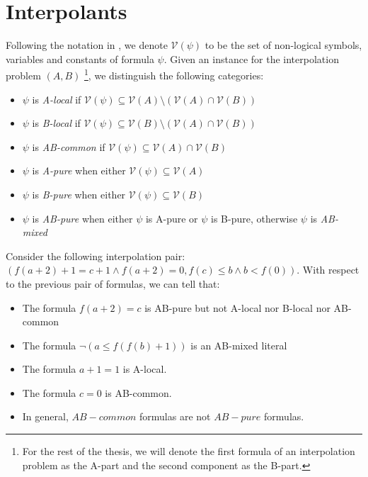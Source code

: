 \section{Interpolants}

Following the notation in \cite{10.1007/11532231_26}, we denote 
$\mathcal{V}(\psi)$ to be the set of non-logical symbols, variables
and constants of formula $\psi$. Given an instance for the interpolation
problem $(A, B)$ \footnote{For the rest of the thesis, we will denote the 
  first formula of an interpolation problem as the A-part 
and the second component as the B-part.}, 
we distinguish the following categories:

\begin{itemize}
  \item $\psi$ is \emph{A-local} if $\mathcal{V}(\psi) \subseteq 
    \mathcal{V}(A) \setminus (\mathcal{V}(A) \cap \mathcal{V}(B))$
  \item $\psi$ is \emph{B-local} if $\mathcal{V}(\psi) \subseteq
    \mathcal{V}(B) \setminus (\mathcal{V}(A) \cap \mathcal{V}(B))$
  \item $\psi$ is \emph{AB-common} if $\mathcal{V}(\psi) \subseteq
    \mathcal{V}(A) \cap \mathcal{V}(B)$
\item $\psi$ is \emph{A-pure} when either 
    $\mathcal{V}(\psi) \subseteq \mathcal{V}(A)$ 
\item $\psi$ is \emph{B-pure} when either 
    $\mathcal{V}(\psi) \subseteq \mathcal{V}(B)$ 
  \item $\psi$ is \emph{AB-pure} when either 
    $\psi$ is A-pure or $\psi$ is B-pure, otherwise
    $\psi$ is \emph{AB-mixed}
\end{itemize}

\begin{example} \label{first_example}

  Consider the following interpolation pair: $(f(a + 2) + 1 = c + 1
    \land f(a + 2) = 0
  , f(c) \leq b \land b < f(0))$. With respect to the previous 
  pair of formulas, we can tell that:
  \begin{itemize}
    \item The formula $f(a + 2) = c$ is 
      AB-pure but not A-local nor B-local nor AB-common
    \item The formula $\neg(a \leq f(f(b) + 1))$ is an AB-mixed
      literal
    \item The formula $a + 1 = 1$ is A-local.
    \item The formula $c = 0$ is AB-common.
    \item In general, $AB-common$ formulas are not $AB-pure$ formulas.
  \end{itemize}
\end{example}

